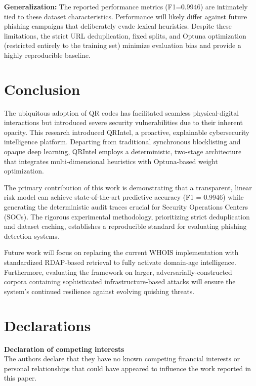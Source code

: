 \documentclass[10pt,twocolumn,letterpaper]{article}
\begin{document}
\textbf{Generalization:} The reported performance metrics (F1=0.9946) are intimately tied to these dataset characteristics. Performance will likely differ against future phishing campaigns that deliberately evade lexical heuristics. Despite these limitations, the strict URL deduplication, fixed splits, and Optuna optimization (restricted entirely to the training set) minimize evaluation bias and provide a highly reproducible baseline.

\section{Conclusion}

The ubiquitous adoption of QR codes has facilitated seamless physical-digital interactions but introduced severe security vulnerabilities due to their inherent opacity. This research introduced QRIntel, a proactive, explainable cybersecurity intelligence platform. Departing from traditional synchronous blocklisting and opaque deep learning, QRIntel employs a deterministic, two-stage architecture that integrates multi-dimensional heuristics with Optuna-based weight optimization.

The primary contribution of this work is demonstrating that a transparent, linear risk model can achieve state-of-the-art predictive accuracy (F1 = 0.9946) while generating the deterministic audit traces crucial for Security Operations Centers (SOCs). The rigorous experimental methodology, prioritizing strict deduplication and dataset caching, establishes a reproducible standard for evaluating phishing detection systems. 

Future work will focus on replacing the current WHOIS implementation with standardized RDAP-based retrieval to fully activate domain-age intelligence. Furthermore, evaluating the framework on larger, adversarially-constructed corpora containing sophisticated infrastructure-based attacks will ensure the system's continued resilience against evolving quishing threats.

\section*{Declarations}

\textbf{Declaration of competing interests}\\
The authors declare that they have no known competing financial interests or personal relationships that could have appeared to influence the work reported in this paper.
\end{document}
